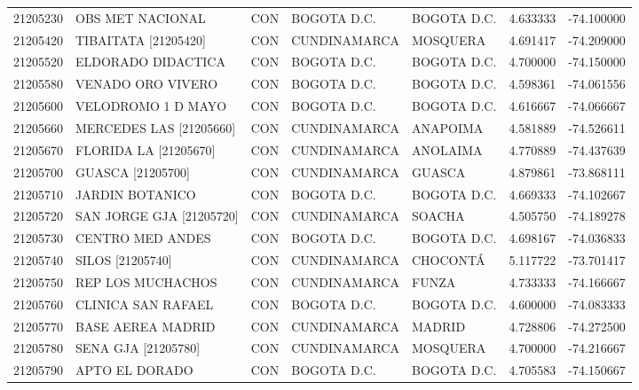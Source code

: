 \begin{longtable}{rllllrr}
 21205230 &            OBS MET NACIONAL &  CON &      BOGOTA D.C. &       BOGOTA D.C. &  4.633333 & -74.100000 \\
 21205420 &        TIBAITATA [21205420] &  CON &     CUNDINAMARCA &          MOSQUERA &  4.691417 & -74.209000 \\
 21205520 &          ELDORADO DIDACTICA &  CON &      BOGOTA D.C. &       BOGOTA D.C. &  4.700000 & -74.150000 \\
 21205580 &           VENADO ORO VIVERO &  CON &      BOGOTA D.C. &       BOGOTA D.C. &  4.598361 & -74.061556 \\
 21205600 &          VELODROMO 1 D MAYO &  CON &      BOGOTA D.C. &       BOGOTA D.C. &  4.616667 & -74.066667 \\
 21205660 &     MERCEDES LAS [21205660] &  CON &     CUNDINAMARCA &          ANAPOIMA &  4.581889 & -74.526611 \\
 21205670 &       FLORIDA LA [21205670] &  CON &     CUNDINAMARCA &          ANOLAIMA &  4.770889 & -74.437639 \\
 21205700 &           GUASCA [21205700] &  CON &     CUNDINAMARCA &            GUASCA &  4.879861 & -73.868111 \\
 21205710 &             JARDIN BOTANICO &  CON &      BOGOTA D.C. &       BOGOTA D.C. &  4.669333 & -74.102667 \\
 21205720 &    SAN JORGE GJA [21205720] &  CON &     CUNDINAMARCA &            SOACHA &  4.505750 & -74.189278 \\
 21205730 &            CENTRO MED ANDES &  CON &      BOGOTA D.C. &       BOGOTA D.C. &  4.698167 & -74.036833 \\
 21205740 &            SILOS [21205740] &  CON &     CUNDINAMARCA &          CHOCONTÁ &  5.117722 & -73.701417 \\
 21205750 &           REP LOS MUCHACHOS &  CON &     CUNDINAMARCA &             FUNZA &  4.733333 & -74.166667 \\
 21205760 &          CLINICA SAN RAFAEL &  CON &      BOGOTA D.C. &       BOGOTA D.C. &  4.600000 & -74.083333 \\
 21205770 &           BASE AEREA MADRID &  CON &     CUNDINAMARCA &            MADRID &  4.728806 & -74.272500 \\
 21205780 &         SENA GJA [21205780] &  CON &     CUNDINAMARCA &          MOSQUERA &  4.700000 & -74.216667 \\
 21205790 &              APTO EL DORADO &  CON &      BOGOTA D.C. &       BOGOTA D.C. &  4.705583 & -74.150667 \\

\end{longtable}
